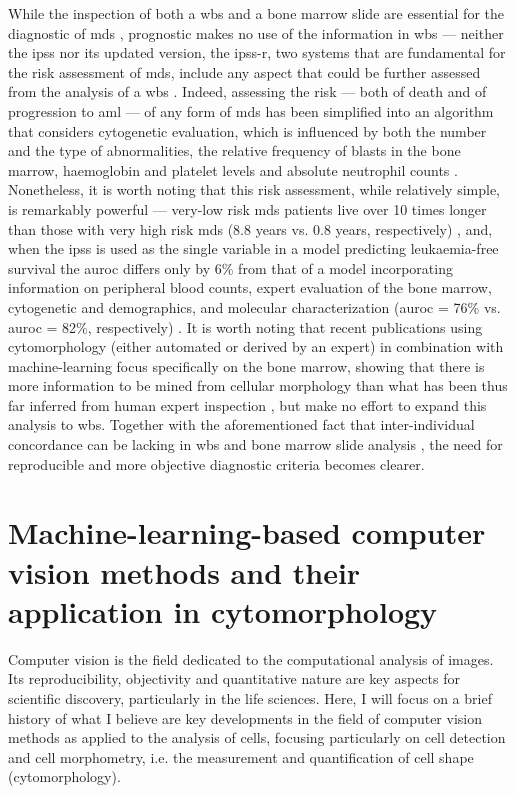While the inspection of both a \ac{wbs} and a bone marrow slide are essential for the diagnostic of \ac{mds} \cite{Greenberg2012-en,Arber2016-os}, prognostic makes no use of the information in \ac{wbs} --- neither the \ac{ipss} nor its updated version, the \ac{ipss-r}, two systems that are fundamental for the risk assessment of \ac{mds}, include any aspect that could be further assessed from the analysis of a \ac{wbs} \cite{Greenberg2012-en}. Indeed, assessing the risk --- both of death and of progression to \ac{aml} --- of any form of \ac{mds} has been simplified into an algorithm that considers cytogenetic evaluation, which is influenced by both the number and the type of abnormalities, the relative frequency of blasts in the bone marrow, haemoglobin and platelet levels and absolute neutrophil counts \cite{Greenberg2012-en}. Nonetheless, it is worth noting that this risk assessment, while relatively simple, is remarkably powerful --- very-low risk \ac{mds} patients live over 10 times longer than those with very high risk \ac{mds} (8.8 years vs. 0.8 years, respectively) \cite{Greenberg2012-en}, and, when the \ac{ipss} is used as the single variable in a model predicting leukaemia-free survival the \ac{auroc} differs only by 6\% from that of a model incorporating information on peripheral blood counts, expert evaluation of the bone marrow, cytogenetic and demographics, and molecular characterization (\ac{auroc} = 76\% vs. \ac{auroc} = 82\%, respectively) \cite{Abelson2018}. It is worth noting that recent publications using cytomorphology (either automated or derived by an expert) in combination with machine-learning focus specifically on the bone marrow, showing that there is more information to be mined from cellular morphology than what has been thus far inferred from human expert inspection \cite{Bruck2021-fx,Nagata2020-lh}, but make no effort to expand this analysis to \ac{wbs}. Together with the aforementioned fact that inter-individual concordance can be lacking in \ac{wbs} and bone marrow slide analysis \cite{Font2013-lx, Parmentier2012-wm, Della_Porta2015-hw}, the need for reproducible and more objective diagnostic criteria becomes clearer.

\section{Machine-learning-based computer vision methods and their application in cytomorphology}

Computer vision is the field dedicated to the computational analysis of images. Its reproducibility, objectivity and quantitative nature are key aspects for scientific discovery, particularly in the life sciences. Here, I will focus on a brief history of what I believe are key developments in the field of computer vision methods as applied to the analysis of cells, focusing particularly on cell detection and cell morphometry, i.e. the measurement and quantification of cell shape (cytomorphology).

